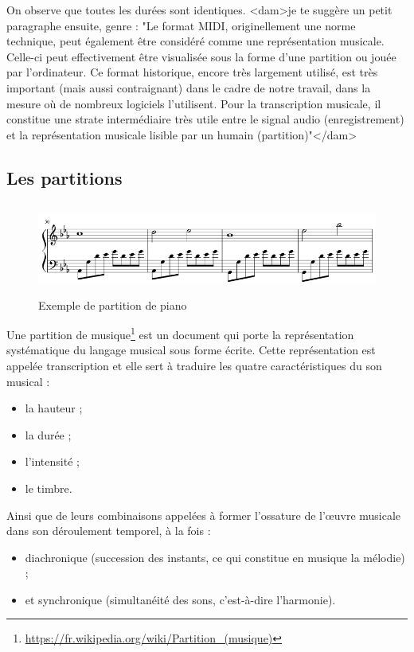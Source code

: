 On observe que toutes les durées sont identiques.
<dam>je te suggère un petit paragraphe ensuite, genre :
"Le format MIDI, originellement une norme technique, peut également être
considéré comme une représentation musicale. Celle-ci peut effectivement être
visualisée sous la forme d'une partition ou jouée par l'ordinateur. Ce format
historique, encore très largement utilisé, est très important (mais aussi
contraignant) dans le cadre de notre travail, dans la mesure où de nombreux
logiciels l'utilisent. Pour la transcription musicale, il constitue une strate
intermédiaire très utile entre le signal audio (enregistrement) et la
représentation musicale lisible par un humain (partition)"</dam>
\subsection*{Les partitions}
\begin{figure}[h!]
	\centering
	\includegraphics[height=30mm, width=120mm]{z_images/1_contexte/5_partition_piano.png}
	\caption{Exemple de partition de piano}
\end{figure}

Une partition de musique\footnote{\url{https://fr.wikipedia.org/wiki/Partition\_(musique)}} est un document qui porte la représentation systématique du langage musical sous forme écrite. Cette représentation est appelée transcription et elle sert à traduire les quatre caractéristiques du son musical :
\begin{itemize}
	\item la hauteur ;
	\item la durée ;
	\item l’intensité ;
	\item le timbre.
\end{itemize}

Ainsi que de leurs combinaisons appelées à former l’ossature de l’œuvre musicale dans son déroulement temporel, à la fois :
\begin{itemize}
	\item diachronique (succession des instants, ce qui constitue en musique la mélodie) ;
	\item et synchronique (simultanéité des sons, c’est-à-dire l’harmonie).
\end{itemize}

